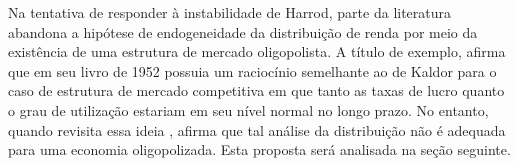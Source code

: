 Na tentativa de responder à instabilidade de Harrod, parte da literatura abandona a hipótese de endogeneidade da distribuição de renda por meio da existência de uma estrutura de mercado oligopolista. A título de exemplo, \citeauthor*{steindl_maturity_1952} afirma que em seu livro de 1952 \cite{steindl_maturity_1952} possuia um raciocínio semelhante ao de Kaldor para o caso de estrutura de mercado competitiva em que tanto as taxas de lucro quanto o grau de utilização estariam em seu nível normal no longo prazo. No entanto, quando revisita essa ideia \cite{steindl_stagnation_1979}, afirma que tal análise da distribuição não é adequada para uma economia oligopolizada. Esta proposta será analisada na seção seguinte.

\begin{comment}
DESCARTADOS

\begin{equation}
\frac{I}{K} = g = \gamma + \gamma_r r
\end{equation}
Esse raciocínio pode ser traduzido em termos da equação \ref{Sintetica}\footnote{A versão proposta por \textcite{pasinetti_rate_1962} explicita as condições de \textit{stedy state} em que a taxa de juros e lucros precisam ser iguais no longo prazo. \textcite[p.~101]{kurz_post-keynesian_2010} destacam que a função poupança de Kaldor só é possível no longo prazo se a taxa de juros não exceder a taxa de lucros. Além disso, a exclusão da propensão marginal à poupar dos trabalhadores é decorrência do ``Teorema de Pasinetti'' em que a taxa de lucro independe da poupança dos trabalhadores.
}:

\begin{equation}
\label{Cambridge_Parcial}
\gamma + \gamma_r r = \mybox{$g = g_K$} =  f\frac{s_k\cdot u_N}{\overline v}
\end{equation}
Adiante, decompõe-se a taxa de lucro ($r$) nos termos de \textcite{weisskopf_marxian_1979}:
$$
r = \frac{P}{K} = \frac{P}{Y}\frac{Y}{Y_{FC}}\frac{Y_{FC}}{K}
$$
em que $P$ é a massa de lucros e $\omega$ o \textit{wage-share}. Como a relação capital-produto é considerada constante, a taxa de lucro depende simultaneamente do grau de utilização e distribuição de renda:
\begin{equation}
\label{Decomposicao_Lucro}
r = \frac{(1-\omega)\cdot u}{\overline v}  
\end{equation}
Substituindo a equação \ref{Decomposicao_Lucro} na \ref{Cambridge_Parcial}, obtém-se

$$
\gamma + \gamma_r \frac{(1-\omega)\cdot u}{\overline v} = \mybox{$g = g_K$} =  f\frac{s\cdot u}{\overline v}
$$



\end{comment}
